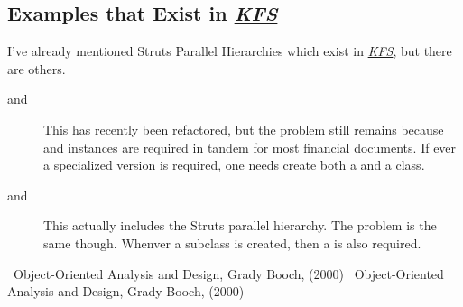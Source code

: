 \documentclass[12pt,notitlepage]{article}
\newcommand{\KFS}{\emph{\href{http://www.kuali.org}{KFS}}}
\begin{document}
\begin{s5presentation}
\begin{s5slide}
      \subsection{Examples that Exist in \KFS}
      I've already mentioned Struts Parallel Hierarchies which exist in \KFS, but there are others. 

      \begin{description}
        \item[\rm{} and \rm{}]
          This has recently been refactored, but the problem still remains because 
          \rm{} and \rm{} instances are required in tandem for most financial documents. 
          If ever a specialized version is required, one needs create both a \rm{} and a \rm{}
          class.
        \item[\rm{} and \rm{}]
          This actually includes the Struts parallel hierarchy. The problem is the same though. Whenver a \rm{} subclass 
          is created, then a \rm{} is also required.
      \end{description}

  \W \end{s5slide}

  \W \end{s5presentation}
  \begin{tex}
    \begin{thebibliography}{20}
     ~Object-Oriented Analysis and Design, Grady Booch, (2000) 
     ~Object-Oriented Analysis and Design, Grady Booch, (2000) 
    \end{thebibliography}
  \end{tex}
\end{document}
